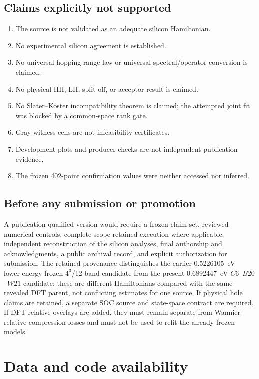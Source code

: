 \documentclass[11pt]{article}
\theoremstyle{definition}
\begin{document}
\subsection{Claims explicitly not supported}

\begin{enumerate}[leftmargin=2em]
 \item The source is not validated as an adequate silicon Hamiltonian.
 \item No experimental silicon agreement is established.
 \item No universal hopping-range law or universal spectral/operator conversion is
 claimed.
 \item No physical HH, LH, split-off, or acceptor result is claimed.
 \item No Slater--Koster incompatibility theorem is claimed; the attempted joint fit was
 blocked by a common-space rank gate.
 \item Gray witness cells are not infeasibility certificates.
 \item Development plots and producer checks are not independent publication evidence.
 \item The frozen 402-point confirmation values were neither accessed nor inferred.
\end{enumerate}

\subsection{Before any submission or promotion}

A publication-qualified version would require a frozen claim set, reviewed numerical
controls, complete-scope retained execution where applicable, independent reconstruction
of the silicon analyses, final authorship and acknowledgments, a public archival record,
and explicit authorization for submission.  The retained provenance distinguishes the
earlier 0.5226105~eV lower-energy-frozen $4^3$/12-band candidate from the present
0.6892447~eV $C6$--$B20$--$W21$ candidate; these are different Hamiltonians compared with
the same revealed DFT parent, not conflicting estimates for one source.  If physical
hole claims are retained, a separate SOC source and state-space contract are
required.  If DFT-relative overlays are added, they must remain separate from
Wannier-relative compression losses and must not be used to refit the already frozen
models.

\section*{Data and code availability}
\end{document}
